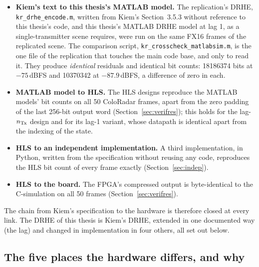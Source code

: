 \begingroup\sloppy
\begin{itemize}
\item \textbf{Kiem's text to this thesis's MATLAB model.} The
replication's DRHE, \texttt{kr\_drhe\_encode.m}, written from Kiem's Section~3.5.3 without
reference to this thesis's code, and this thesis's MATLAB DRHE model at lag 1,
as a single-transmitter scene requires, were run on the same FX16 frames of the
replicated scene. The comparison script,
\texttt{kr\_crosscheck\_matlabsim.m}, is the one file of the replication that
touches the main code base, and only to read it. They produce
\emph{identical} residuals and identical bit counts: \num{18186374} bits at
$-75$\,dBFS and \num{10370342} at $-87.9$\,dBFS, a difference of zero in
each.
\item \textbf{MATLAB model to HLS.} The HLS designs reproduce the MATLAB
models' bit counts on all 50 ColoRadar frames, apart from the zero padding of
the last 256-bit output word (Section~\ref{sec:verifres}); this holds for the
lag-$n_{\mathrm{Tx}}$ design and for its lag-1 variant, whose datapath is identical apart
from the indexing of the state.
\item \textbf{HLS to an independent implementation.} A third implementation, in
Python, written from the specification without reusing any code, reproduces the
HLS bit count of every frame exactly (Section~\ref{sec:indep}).
\item \textbf{HLS to the board.} The FPGA's compressed output is byte-identical
to the C-simulation on all 50 frames (Section~\ref{sec:verifres}).
\end{itemize}
\endgroup

\noindent
The chain from Kiem's specification to the hardware is therefore closed at
every link. The DRHE of this thesis is Kiem's DRHE, extended in one documented
way (the lag) and changed in implementation in four others, all set out
below.

\subsection{The five places the hardware differs, and why}
\label{sec:kc_why}

